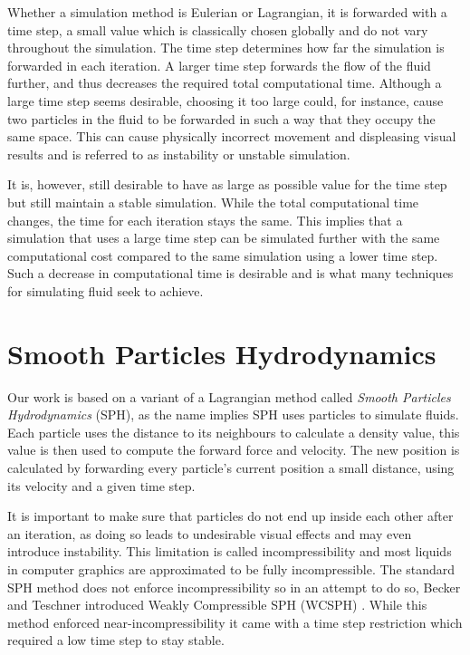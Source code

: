 \documentclass[../../main.tex]{subfiles}
\begin{document}
Whether a simulation method is Eulerian or Lagrangian, it is forwarded with a time step, a small value which is classically chosen globally and do not vary throughout the simulation. The time step determines how far the simulation is forwarded in each iteration. A larger time step forwards the flow of the fluid further, and thus decreases the required total computational time. Although a large time step seems desirable, choosing it too large could, for instance, cause two particles in the fluid to be forwarded in such a way that they occupy the same space. This can cause physically incorrect movement and displeasing visual results and is referred to as instability or unstable simulation.

It is, however, still desirable to have as large as possible value for the time step but still maintain a stable simulation. While the total computational time changes, the time for each iteration stays the same. This implies that a simulation that uses a large time step can be simulated further with the same computational cost compared to the same simulation using a lower time step. Such a decrease in computational time is desirable and is what many techniques for simulating fluid seek to achieve.


\section{Smooth Particles Hydrodynamics}
Our work is based on a variant of a Lagrangian method called \textit{Smooth Particles Hydrodynamics} (SPH), as the name implies SPH uses particles to simulate fluids. Each particle uses the distance to its neighbours to calculate a density value, this value is then used to compute the forward force and velocity. The new position is calculated by forwarding every particle's current position a small distance, using its velocity and a given time step. 

It is important to make sure that particles do not end up inside each other after an iteration, as doing so leads to undesirable visual effects and may even introduce instability. This limitation is called incompressibility and most liquids in computer graphics are approximated to be fully incompressible. The standard SPH method \citep{lucy1977numerical} does not enforce incompressibility so in an attempt to do so, Becker and Teschner introduced Weakly Compressible SPH (WCSPH) \citep{becker2007weakly}. While this method enforced near-incompressibility it came with a time step restriction which required a low time step to stay stable.
\end{document}
